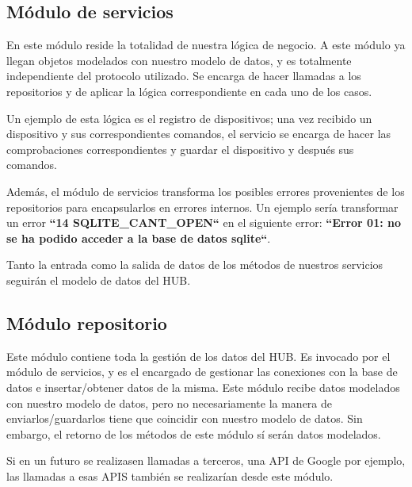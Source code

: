 \subsection{Módulo de servicios}
En este módulo reside la totalidad de nuestra lógica de negocio. A este módulo ya llegan objetos modelados con nuestro modelo de datos, y es totalmente
independiente del protocolo utilizado. Se encarga de hacer llamadas a los repositorios y de aplicar la lógica correspondiente en cada uno de los casos.
\par
Un ejemplo de esta lógica es el registro de dispositivos; una vez recibido un dispositivo y sus correspondientes comandos, el servicio se encarga de hacer
las comprobaciones correspondientes y guardar el dispositivo y después sus comandos.
\par
Además, el módulo de servicios transforma los posibles errores provenientes de los repositorios para encapsularlos en errores internos. Un ejemplo sería
transformar un error \textbf{``14 SQLITE\_CANT\_OPEN``} en el siguiente error: \textbf{``Error 01: no se ha podido acceder a la base de datos sqlite``}.
\par
Tanto la entrada como la salida de datos de los métodos de nuestros servicios seguirán el modelo de datos del HUB.
\subsection{Módulo repositorio}
Este módulo contiene toda la gestión de los datos del HUB. Es invocado por el módulo de servicios, y 
es el encargado de gestionar las conexiones con la base de datos e insertar/obtener datos de la misma.
Este módulo recibe datos modelados con nuestro modelo de datos, pero no necesariamente la manera de enviarlos/guardarlos tiene que coincidir con nuestro modelo 
de datos. Sin embargo, el retorno de los métodos de este módulo sí serán datos modelados.
\par
Si en un futuro se realizasen llamadas a terceros, una API de Google por ejemplo, las llamadas a esas APIS también se realizarían desde este módulo.
